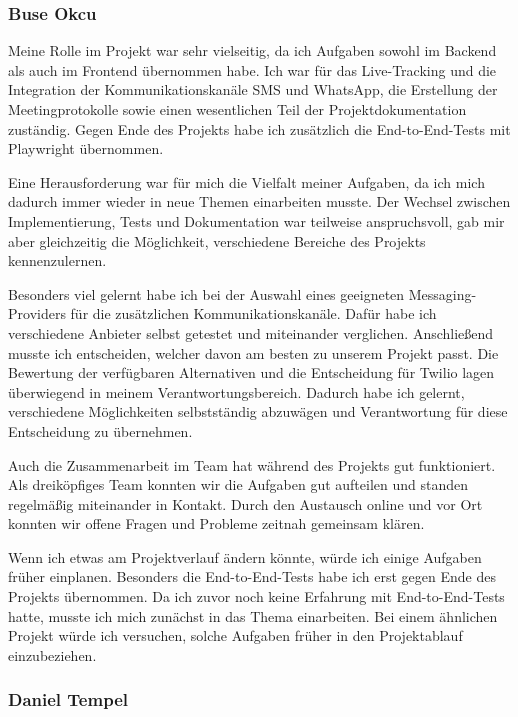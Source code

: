 \subsubsection{Buse Okcu}
\nopagebreak

Meine Rolle im Projekt war sehr vielseitig, da ich Aufgaben
sowohl im Backend als auch im Frontend übernommen habe. Ich war
für das Live-Tracking und die Integration der
Kommunikationskanäle SMS und WhatsApp, die Erstellung der Meetingprotokolle 
sowie einen wesentlichen Teil der Projektdokumentation zuständig. Gegen Ende des Projekts 
habe ich zusätzlich die End-to-End-Tests mit Playwright übernommen.

Eine Herausforderung war für mich die Vielfalt meiner Aufgaben,
da ich mich dadurch immer wieder in neue Themen einarbeiten
musste. Der Wechsel zwischen Implementierung, Tests und
Dokumentation war teilweise anspruchsvoll, gab mir aber
gleichzeitig die Möglichkeit, verschiedene Bereiche des
Projekts kennenzulernen.

Besonders viel gelernt habe ich bei der Auswahl eines geeigneten
Messaging-Providers für die zusätzlichen Kommunikationskanäle. Dafür habe ich verschiedene
Anbieter selbst getestet und miteinander verglichen. Anschließend musste ich
entscheiden, welcher davon am besten zu unserem Projekt passt.
Die Bewertung der verfügbaren Alternativen und die Entscheidung für
Twilio lagen überwiegend in meinem Verantwortungsbereich. Dadurch
habe ich gelernt, verschiedene Möglichkeiten selbstständig abzuwägen
und Verantwortung für diese Entscheidung zu übernehmen.

Auch die Zusammenarbeit im Team hat während des Projekts gut
funktioniert. Als dreiköpfiges Team konnten wir die
Aufgaben gut aufteilen und standen regelmäßig miteinander in
Kontakt. Durch den Austausch online und vor Ort konnten wir
offene Fragen und Probleme zeitnah gemeinsam klären.

Wenn ich etwas am Projektverlauf ändern könnte, würde ich einige
Aufgaben früher einplanen. Besonders die End-to-End-Tests habe
ich erst gegen Ende des Projekts übernommen. Da ich zuvor noch
keine Erfahrung mit End-to-End-Tests hatte, musste ich mich
zunächst in das Thema einarbeiten. Bei einem ähnlichen Projekt
würde ich versuchen, solche Aufgaben früher in den Projektablauf
einzubeziehen.

\subsubsection{Daniel Tempel}
\nopagebreak

